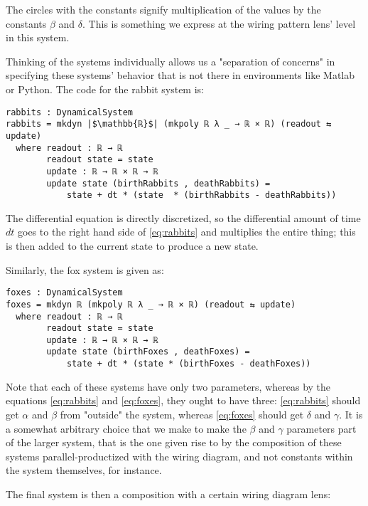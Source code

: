 The circles with the constants signify multiplication of the values by the constants $\beta$ and $\delta$. This is something we express at the wiring pattern lens' level in this system. 

Thinking of the systems individually allows us a "separation of concerns" in specifying these systems' behavior that is not there in environments like Matlab or Python. The code for the rabbit system is:
\begin{verbatim}
rabbits : DynamicalSystem
rabbits = mkdyn |$\mathbb{ℝ}$| (mkpoly ℝ λ _ → ℝ × ℝ) (readout ⇆ update)
  where readout : ℝ → ℝ
        readout state = state
        update : ℝ → ℝ × ℝ → ℝ
        update state (birthRabbits , deathRabbits) = 
            state + dt * (state  * (birthRabbits - deathRabbits))
\end{verbatim}
The differential equation is directly discretized, so the differential amount of time $dt$ goes to the right hand side of \ref{eq:rabbits} and multiplies the entire thing; this is then added to the current state to produce a new state.

Similarly, the fox system is given as:
\begin{verbatim}
foxes : DynamicalSystem
foxes = mkdyn ℝ (mkpoly ℝ λ _ → ℝ × ℝ) (readout ⇆ update)
  where readout : ℝ → ℝ
        readout state = state
        update : ℝ → ℝ × ℝ → ℝ
        update state (birthFoxes , deathFoxes) = 
            state + dt * (state * (birthFoxes - deathFoxes))
\end{verbatim}

Note that each of these systems have only two parameters, whereas by the equations \ref{eq:rabbits} and \ref{eq:foxes}, they ought to have three: \ref{eq:rabbits} should get $\alpha$ and $\beta$ from "outside" the system, whereas \ref{eq:foxes} should get $\delta$ and $\gamma$. It is a somewhat arbitrary choice that we make to make the $\beta$ and $\gamma$ parameters part of the larger system, that is the one given rise to by the composition of these systems parallel-productized with the wiring diagram, and not constants within the system themselves, for instance.

The final system is then a composition with a certain wiring diagram lens:

